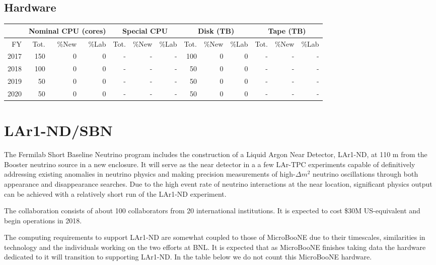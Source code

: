 \documentclass[pdftex,12pt,letter]{article}
\begin{document}
\subsection{Hardware}

\begin{tabular}[h]{|r || r|r|r || r|r|r || r|r|r || r|r|r ||}
  \hline
   & \multicolumn{3}{c||}{Nominal CPU (cores)} & \multicolumn{3}{c||}{Special CPU} & \multicolumn{3}{c||}{Disk (TB)} & \multicolumn{3}{c||}{Tape (TB)} \\
   \hline
  FY & Tot. & \%New & \%Lab & Tot. & \%New & \%Lab & Tot. & \%New & \%Lab & Tot. & \%New & \%Lab \\
  \hline
  2017 & 150& 0& 0& -& -& -& 100& 0 & 0 & -& -& - \\
  \hline
  2018 & 100& 0& 0& -& -& -& 50& 0 & 0 & -& -& - \\
  \hline
  2019 & 50& 0& 0& -& -& -& 50& 0 & 0 & -& -& - \\
  \hline
 2020 & 50& 0& 0& -& -& -& 50& 0& 0& -& -& - \\
  \hline
\end{tabular}


\pagebreak
\section{LAr1-ND/SBN}



The Fermilab Short Baseline Neutrino program includes the construction
of a Liquid Argon Near Detector, LAr1-ND, at 110 m from the Booster
neutrino source in a new enclosure.
It will serve as the near detector in a a few LAr-TPC experiments
capable of definitively addressing existing anomalies in neutrino
physics and making precision measurements of high-$\Delta m^2$
neutrino oscillations through both appearance and disappearance
searches.
Due to the high event rate of neutrino interactions at the near
location, significant physics output can be achieved with a relatively
short run of the LAr1-ND experiment.  

The collaboration consists of about 100 collaborators from 20
international institutions.
It is expected to cost \$30M US-equivalent and begin operations in
2018. 

The computing requirements to support LAr1-ND are somewhat coupled to
those of MicroBooNE due to their timescales, similarities in
technology and the individuals working on the two efforts at BNL.
It is expected that as MicroBooNE finishes taking data the hardware
dedicated to it will transition to supporting LAr1-ND.
In the table below we do not count this MicroBooNE hardware.
\end{document}
